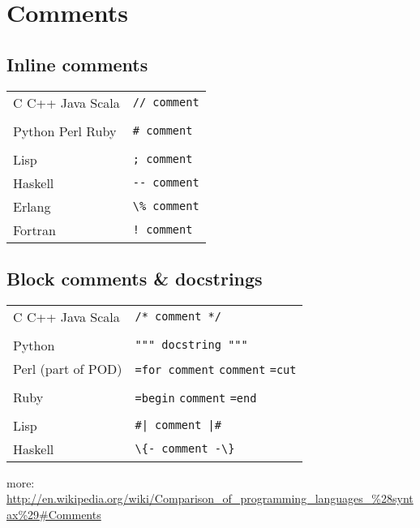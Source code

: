 \documentclass{article}
\begin{document}
\section{Comments}
\subsection{Inline comments}
\begin{longtabu} to 0.75\linewidth { X X }
	C \newline
    C++ \newline
    Java \newline
    Scala & \lstinline$// comment$ \\
	\\[-0.3em]
	Python \newline
    Perl \newline
    Ruby & \lstinline$# comment$ \\
	\\[-0.3em]
	Lisp & \lstinline$; comment$ \\
	Haskell & \lstinline$-- comment$ \\
	Erlang & \lstinline$\% comment$ \\
	Fortran & \lstinline$! comment$ \\
\end{longtabu}

\subsection{Block comments \& docstrings}
\begin{longtabu} to 0.75\linewidth { X X }
	C \newline
    C++ \newline
    Java \newline
    Scala & \lstinline$/* comment */$ \\
    \\[-0.3em]
	Python & \lstinline$""" docstring """$ \\
    Perl (part of POD) & \lstinline$=for comment$ \newline
    \lstinline$comment$ \newline
    \lstinline$=cut$  \\
	\\[-0.3em]
    Ruby & \lstinline$=begin$ \newline
    \lstinline$comment$ \newline
    \lstinline$=end$ \\
    \\[-0.3em]
	Lisp & \lstinline$#| comment |#$ \\
	Haskell & \lstinline$\{- comment -\}$ \\
\end{longtabu}
more: \url{http://en.wikipedia.org/wiki/Comparison_of_programming_languages_%28syntax%29#Comments}
\end{document}
